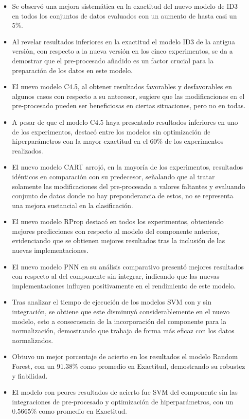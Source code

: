 	\begin{itemize}
	\item Se observó una mejora sistemática en la exactitud del nuevo modelo de ID3 en todos los conjuntos de datos evaluados con un aumento de hasta casi un 5\%.
	\item Al revelar resultados inferiores en la exactitud el modelo ID3 de la antigua versión, con respecto a la nueva versión en los cinco experimentos, se da a demostrar que el pre-procesado añadido es un factor crucial para la preparación de los datos en este modelo.
	\item El nuevo modelo C4.5, al obtener resultados favorables y desfavorables en algunos casos con respecto a su antecesor, sugiere que las modificaciones en el pre-procesado pueden ser beneficiosas en ciertas situaciones, pero no en todas. 
	\item A pesar de que el modelo C4.5 haya presentado resultados inferiores en uno de los experimentos, destacó entre los modelos sin optimización de hiperparámetros con la mayor exactitud en el 60\% de los experimentos realizados.
	\item El nuevo modelo CART arrojó, en la mayoría de los experimentos, resultados idénticos en comparación con su predecesor, señalando que al tratar solamente las modificaciones del pre-procesado a valores faltantes y evaluando conjunto de datos donde no hay preponderancia de estos, no se representa una mejora sustancial en la clasificación.
	\item El nuevo modelo RProp destacó en todos los experimentos, obteniendo mejores predicciones con respecto al modelo del componente anterior, evidenciando que se obtienen mejores resultados tras la inclusión de las nuevas implementaciones.
	\item El nuevo modelo PNN en su análisis comparativo presentó mejores resultados con respecto al del componente sin integrar, indicando que las nuevas implementaciones influyen positivamente en el rendimiento de este modelo.
	\item Tras analizar el tiempo de ejecución de los modelos SVM con y sin integración, se obtiene que este disminuyó considerablemente en el nuevo modelo, esto a consecuencia de la incorporación del componente para la normalización, demostrando que trabaja de forma más eficaz con los datos normalizados. 
	\item Obtuvo un mejor porcentaje de acierto en los resultados el modelo Random Forest, con un 91.38\% como promedio en Exactitud, demostrando su robustez y fiabilidad.
	\item El modelo con peores resultados de acierto fue SVM del componente sin las integraciones de pre-procesado y optimización de hiperparámetros, con un 0.5665\% como promedio en Exactitud.
\end{itemize}


\pagebreak
